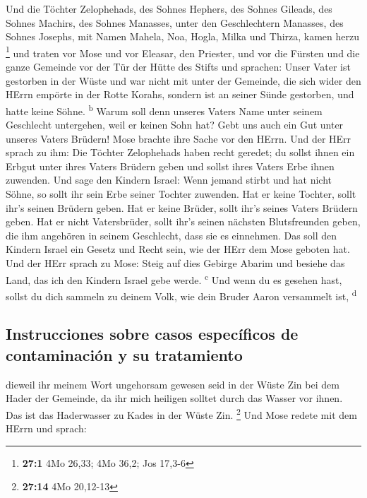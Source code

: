  Und die Töchter Zelophehads, des Sohnes Hephers, des
Sohnes Gileads, des Sohnes Machirs, des Sohnes Manasses, unter den
Geschlechtern Manasses, des Sohnes Josephs, mit Namen Mahela, Noa,
Hogla, Milka und Thirza, kamen herzu \footnote{\textbf{27:1} 4Mo 26,33;
  4Mo 36,2; Jos 17,3-6}  und traten vor Mose und vor
Eleasar, den Priester, und vor die Fürsten und die ganze Gemeinde vor
der Tür der Hütte des Stifts und sprachen:  Unser Vater
ist gestorben in der Wüste und war nicht mit unter der Gemeinde, die
sich wider den HErrn empörte in der Rotte Korahs, sondern ist an seiner
Sünde gestorben, und hatte keine Söhne. \textsuperscript{b}
 Warum soll denn unseres Vaters Name unter seinem
Geschlecht untergehen, weil er keinen Sohn hat? Gebt uns auch ein Gut
unter unseres Vaters Brüdern!  Mose brachte ihre Sache vor
den HErrn.  Und der HErr sprach zu ihm:  Die
Töchter Zelophehads haben recht geredet; du sollst ihnen ein Erbgut
unter ihres Vaters Brüdern geben und sollst ihres Vaters Erbe ihnen
zuwenden.  Und sage den Kindern Israel: Wenn jemand stirbt
und hat nicht Söhne, so sollt ihr sein Erbe seiner Tochter zuwenden.
 Hat er keine Tochter, sollt ihr's seinen Brüdern geben.
 Hat er keine Brüder, sollt ihr's seines Vaters Brüdern
geben.  Hat er nicht Vatersbrüder, sollt ihr's seinen
nächsten Blutsfreunden geben, die ihm angehören in seinem Geschlecht,
dass sie es einnehmen. Das soll den Kindern Israel ein Gesetz und Recht
sein, wie der HErr dem Mose geboten hat.  Und der HErr
sprach zu Mose: Steig auf dies Gebirge Abarim und besiehe das Land, das
ich den Kindern Israel gebe werde. \textsuperscript{c} 
Und wenn du es gesehen hast, sollst du dich sammeln zu deinem Volk, wie
dein Bruder Aaron versammelt ist, \textsuperscript{d}

\hypertarget{instrucciones-sobre-casos-especuxedficos-de-contaminaciuxf3n-y-su-tratamiento}{%
\subsection{Instrucciones sobre casos específicos de contaminación y su
tratamiento}\label{instrucciones-sobre-casos-especuxedficos-de-contaminaciuxf3n-y-su-tratamiento}}

 dieweil ihr meinem Wort ungehorsam gewesen seid in der
Wüste Zin bei dem Hader der Gemeinde, da ihr mich heiligen solltet durch
das Wasser vor ihnen. Das ist das Haderwasser zu Kades in der Wüste Zin.
\footnote{\textbf{27:14} 4Mo 20,12-13}  Und Mose redete
mit dem HErrn und sprach:

